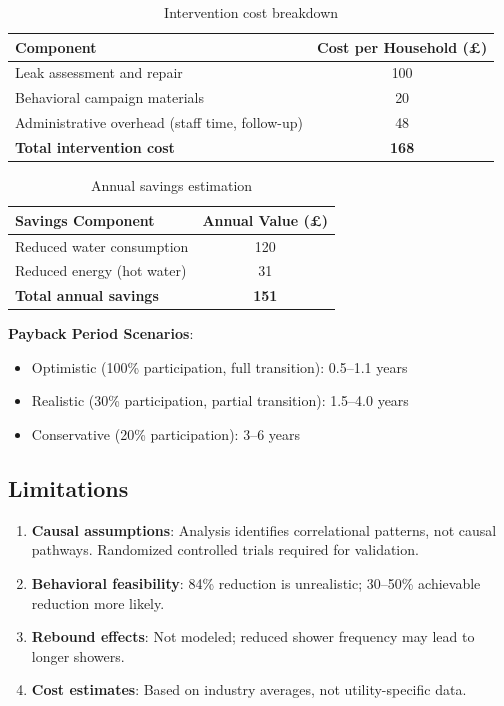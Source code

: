 \documentclass[a4paper,12pt]{article}
\begin{document}
\begin{table}[htbp]
    \centering
    \caption{Intervention cost breakdown}
    \begin{tabular}{lc}
        \toprule
        Component & Cost per Household (£) \\
        \midrule
        Leak assessment and repair & 100 \\
        Behavioral campaign materials & 20 \\
        Administrative overhead (staff time, follow-up) & 48 \\
        \midrule
        \textbf{Total intervention cost} & \textbf{168} \\
        \bottomrule
    \end{tabular}
\end{table}

\begin{table}[htbp]
    \centering
    \caption{Annual savings estimation}
    \begin{tabular}{lc}
        \toprule
        Savings Component & Annual Value (£) \\
        \midrule
        Reduced water consumption & 120 \\
        Reduced energy (hot water) & 31 \\
        \midrule
        \textbf{Total annual savings} & \textbf{151} \\
        \bottomrule
    \end{tabular}
\end{table}

\textbf{Payback Period Scenarios}:
\begin{itemize}
    \item Optimistic (100\% participation, full transition): 0.5--1.1 years
    \item Realistic (30\% participation, partial transition): 1.5--4.0 years
    \item Conservative (20\% participation): 3--6 years
\end{itemize}

\subsection{Limitations}
\begin{enumerate}
    \item \textbf{Causal assumptions}: Analysis identifies correlational patterns, not causal pathways. Randomized controlled trials required for validation.
    \item \textbf{Behavioral feasibility}: 84\% reduction is unrealistic; 30--50\% achievable reduction more likely.
    \item \textbf{Rebound effects}: Not modeled; reduced shower frequency may lead to longer showers.
    \item \textbf{Cost estimates}: Based on industry averages, not utility-specific data.
\end{enumerate}
\end{document}
